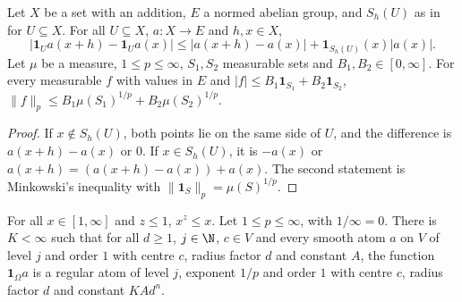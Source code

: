 \begin{lemma}
\label{lem:cut-off-differences}
\leanok
{}
Let $X$ be a set with an addition, $E$ a normed abelian group, and $S_h(U)$ as in
 for $U \subseteq X$. For all $U \subseteq X$, $a : X \to E$
and $h, x \in X$,
\[
  |\mathbf 1_U a(x + h) - \mathbf 1_U a(x)| \leq |a(x + h) - a(x)| + \mathbf 1_{S_h(U)}(x) |a(x)| .
\]
Let $\mu$ be a measure, $1 \leq p \leq \infty$, $S_1, S_2$ measurable sets and
$B_1, B_2 \in [0, \infty]$. For every measurable $f$ with values in $E$ and
$|f| \leq B_1 \mathbf 1_{S_1} + B_2 \mathbf 1_{S_2}$,
$\|f\|_p \leq B_1 \mu(S_1)^{1/p} + B_2 \mu(S_2)^{1/p}$.
\end{lemma}

\begin{proof}
\leanok
If $x \notin S_h(U)$, both points lie on the same side of $U$, and the difference is
$a(x + h) - a(x)$ or $0$. If $x \in S_h(U)$, it is $-a(x)$ or
$a(x + h) = (a(x + h) - a(x)) + a(x)$. The second statement is Minkowski's inequality with
$\|\mathbf 1_S\|_p = \mu(S)^{1/p}$.
\end{proof}

\begin{lemma}
\label{lem:indicator-atoms}
\leanok
{}
For all $x \in [1, \infty]$ and $z \leq 1$, $x^z \leq x$. Let $1 \leq p \leq \infty$, with
$1/\infty = 0$. There is $K < \infty$ such that for all $d \geq 1$, $j \in \N$, $c \in V$ and
every smooth atom $a$ on $V$ of level $j$ and order $1$ with centre $c$, radius factor $d$ and
constant $A$, the function $\mathbf 1_\Omega a$ is a regular atom of level $j$, exponent $1/p$
and order $1$ with centre $c$, radius factor $d$ and constant $K A d^n$.
\end{lemma}

